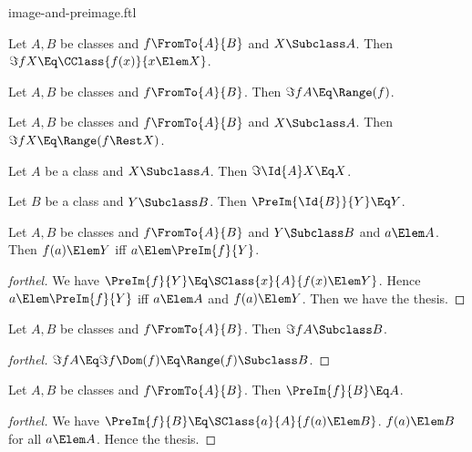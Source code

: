 \documentclass{stex}
\begin{document}
\begin{smodule}{image-and-preimage.ftl}


\begin{proposition*}[forthel]
  Let $A, B$ be classes and $f \FromTo{A}{B}$ and $X \Subclass A$.
  Then $\Im{f}{X} \Eq \CClass{f(x)}{x \Elem X}$.
\end{proposition*}

\begin{proposition*}[forthel]
  Let $A, B$ be classes and $f \FromTo{A}{B}$.
  Then $\Im{f}{A} \Eq \Range(f)$.
\end{proposition*}

\begin{proposition*}[forthel]
  Let $A, B$ be classes and $f \FromTo{A}{B}$ and $X \Subclass A$.
  Then $\Im{f}{X} \Eq \Range(f \Rest X)$.
\end{proposition*}

\begin{proposition*}[forthel]
  Let $A$ be a class and $X \Subclass A$.
  Then $\Im{\Id{A}}{X} \Eq X$.
\end{proposition*}

\begin{proposition*}[forthel]
  Let $B$ be a class and $Y \Subclass B$.
  Then $\PreIm{\Id{B}}{Y} \Eq Y$.
\end{proposition*}

\begin{proposition*}[forthel]
  Let $A, B$ be classes and $f \FromTo{A}{B}$ and $Y \Subclass B$ and $a \Elem A$.
  Then $f(a) \Elem Y$ iff $a \Elem \PreIm{f}{Y}$.
\end{proposition*}
\begin{proof}[forthel]
  We have $\PreIm{f}{Y} \Eq \SClass{x}{A}{f(x) \Elem Y}$.
  Hence $a \Elem \PreIm{f}{Y}$ iff $a \Elem A$ and $f(a) \Elem Y$.
  Then we have the thesis.
\end{proof}

\begin{proposition*}[forthel]
  Let $A, B$ be classes and $f \FromTo{A}{B}$.
  Then $\Im{f}{A} \Subclass B$.
\end{proposition*}
\begin{proof}[forthel]
  $\Im{f}{A}
    \Eq \Im{f}{\Dom(f)}
    \Eq \Range(f)
    \Subclass B$.
\end{proof}

\begin{proposition*}[forthel]
  Let $A, B$ be classes and $f \FromTo{A}{B}$.
  Then $\PreIm{f}{B} \Eq A$.
\end{proposition*}
\begin{proof}[forthel]
  We have $\PreIm{f}{B} \Eq \SClass{a}{A}{f(a) \Elem B}$.
  $f(a) \Elem B$ for all $a \Elem A$.
  Hence the thesis.
\end{proof}


\end{smodule}
\end{document}
